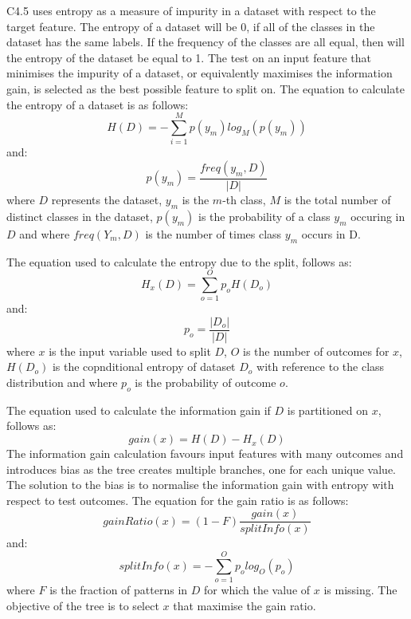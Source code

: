 \documentclass[10pt, conference]{IEEEtran}
\begin{document}
C4.5 uses entropy as a measure of impurity in a dataset with respect to the target feature. The entropy of a
dataset will be 0, if all of the classes in the dataset has the same labels. If the frequency of the
classes are all equal, then will the entropy of the dataset be equal to 1. The test on an input feature
that minimises the impurity of a dataset, or equivalently maximises the information gain, is selected as the
best possible feature to split on. The equation to calculate the entropy of a dataset is as follows:
\begin{equation}
    H(D)=-\sum_{i=1}^{M} p(y_m)log_M (p(y_m))\label{entropy}
\end{equation}
and:
\begin{equation}
    p(y_m) = \frac{freq(y_m,D)}{\left\lvert D \right\rvert }\label{class_prob} 
\end{equation}
where $D$ represents the dataset, $y_m$ is the $m$-th class, $M$ is the total number of distinct classes in the
dataset, $p(y_m)$ is the probability of a class $y_m$ occuring in $D$ and where $freq(Y_m,D)$ is the number of
times class $y_m$ occurs in D.

The equation used to calculate the entropy due to the split, follows as:
\begin{equation}
    H_x(D) = \sum_{o=1}^{O} p_o H(D_o)\label{entropy_x}
\end{equation}
and:
\begin{equation}
    p_o = \frac{\left\lvert D_o \right\rvert}{\left\lvert D \right\rvert}\label{o_prob}
\end{equation}
where $x$ is the input variable used to split $D$, $O$ is the number of outcomes for $x$, $H(D_o)$ is the copnditional entropy of dataset
$D_o$ with reference to the class distribution and where $p_o$ is the probability of outcome $o$.

The equation used to calculate the information gain if $D$ is partitioned on $x$, follows as:
\begin{equation}
    gain(x) = H(D) - H_x(D)\label{info_gain}
\end{equation}
The information gain calculation favours input features with many outcomes and introduces bias as the tree
creates multiple branches, one for each unique value. The solution to the bias is to normalise the information gain with entropy
with respect to test outcomes. The equation for the gain ratio is as follows:
\begin{equation}
    gainRatio(x) = (1-F)\frac{gain(x)}{splitInfo(x)}\label{gainRatio}
\end{equation}
and:
\begin{equation}
    splitInfo(x) = -\sum_{o=1}^{O}p_o log_O(p_o)\label{splitInfo}
\end{equation}
where $F$ is the fraction of patterns in $D$ for which the value of $x$ is missing.
The objective of the tree is to select $x$ that maximise the gain ratio.
\end{document}
